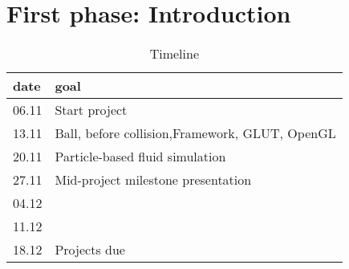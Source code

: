 \chapter*{First phase: Introduction}
\begin{table}
	\centering
	\begin{tabular}{ll}
		\toprule
		date& goal\\
		\midrule
		06.11& Start project\\
		13.11& Ball, before collision,Framework, GLUT, OpenGL\\
		20.11& Particle-based fluid simulation\\
		27.11& Mid-project milestone presentation\\
		04.12& \\
		11.12& \\
		18.12& Projects due\\
		\bottomrule
	\end{tabular}
	\caption{Timeline}
	\label{tab:timeline}
\end{table}
